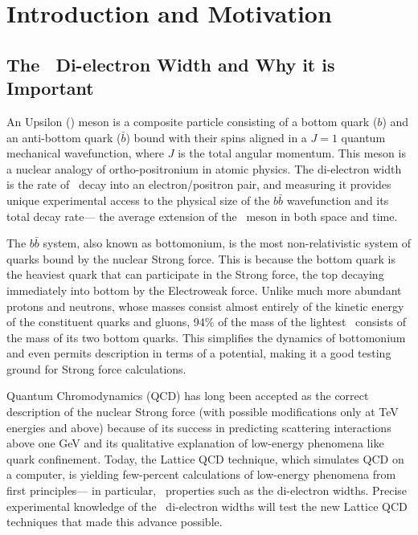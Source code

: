 \documentclass{cornell}
\begin{document}
\normalspacing
\setcounter{page}{1}
\pagestyle{cornellc}

\chapter{Introduction and Motivation}
\label{chp:introduction}

\section{The \boldmath \ups\ Di-electron Width and Why it is Important}

An Upsilon (\ups) meson is a composite particle consisting of a bottom quark
($b$) and an anti-bottom quark ($\bar{b}$) bound with their spins
aligned in a $J=1$ quantum mechanical wavefunction, where $J$ is the
total angular momentum.  This meson is a nuclear analogy of
ortho-positronium in atomic physics.  The di-electron width is the
rate of \ups\ decay into an electron/positron pair, and measuring it
provides unique experimental access to the physical size of the
$b\bar{b}$ wavefunction and its total decay rate--- the average
extension of the \ups\ meson in both space and time.

The $b\bar{b}$ system, also known as bottomonium, is the most
non-relativistic system of quarks bound by the nuclear Strong force.
This is because the bottom quark is the heaviest quark that can
participate in the Strong force, the top decaying immediately into
bottom by the Electroweak force.  Unlike much more abundant protons
and neutrons, whose masses consist almost entirely of the kinetic
energy of the constituent quarks and gluons, 94\% of the mass of the
lightest \ups\ consists of the mass of its two bottom quarks.  This
simplifies the dynamics of bottomonium and even permits description in
terms of a potential, making it a good testing ground for Strong force
calculations.

Quantum Chromodynamics (QCD) has long been accepted as the correct
description of the nuclear Strong force (with possible modifications
only at TeV energies and above) because of its success in predicting
scattering interactions above one GeV and its qualitative explanation
of low-energy phenomena like quark confinement.  Today, the Lattice
QCD technique, which simulates QCD on a computer, is yielding
few-percent calculations of low-energy phenomena from first
principles--- in particular, \ups\ properties such as the di-electron
widths.  Precise experimental knowledge of the \ups\ di-electron
widths will test the new Lattice QCD techniques that made this advance
possible.
\end{document}

